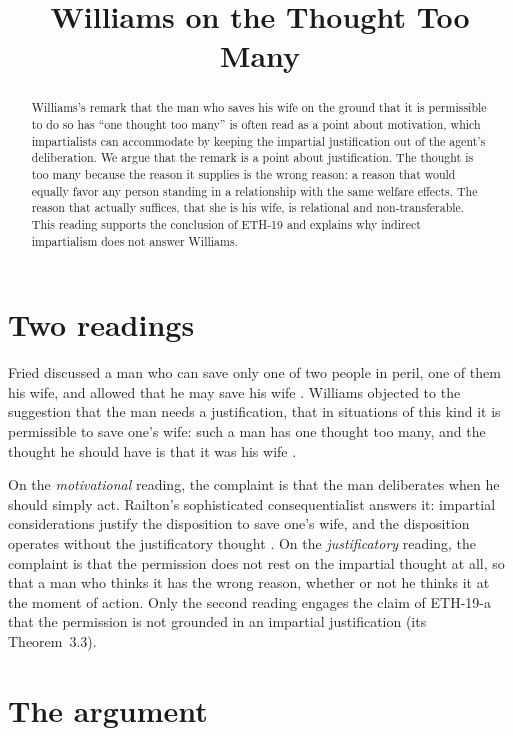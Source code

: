 \documentclass{situationist-preprint}
\title{Williams on the Thought Too Many}
\begin{document}
\maketitle

\begin{abstract}
Williams's remark that the man who saves his wife on the ground that it is permissible to do so has \enquote{one thought too many} is often read as a point about motivation, which impartialists can accommodate by keeping the impartial justification out of the agent's deliberation. We argue that the remark is a point about justification. The thought is too many because the reason it supplies is the wrong reason: a reason that would equally favor any person standing in a relationship with the same welfare effects. The reason that actually suffices, that she is his wife, is relational and non-transferable. This reading supports the conclusion of ETH-19 and explains why indirect impartialism does not answer Williams.
\end{abstract}

\section{Two readings}

Fried discussed a man who can save only one of two people in peril, one of them his wife, and allowed that he may save his wife \citep{Fried1970}. Williams objected to the suggestion that the man needs a justification, that in situations of this kind it is permissible to save one's wife: such a man has one thought too many, and the thought he should have is that it was his wife \citep[18]{Williams1981}.

On the \emph{motivational} reading, the complaint is that the man deliberates when he should simply act. Railton's sophisticated consequentialist answers it: impartial considerations justify the disposition to save one's wife, and the disposition operates without the justificatory thought \citep{Railton1984}. On the \emph{justificatory} reading, the complaint is that the permission does not rest on the impartial thought at all, so that a man who thinks it has the wrong reason, whether or not he thinks it at the moment of action. Only the second reading engages the claim of ETH-19-a that the permission is not grounded in an impartial justification (its Theorem~3.3).

\section{The argument}
\end{document}
